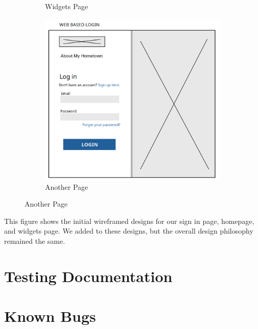 \documentclass[12pt]{article}
\begin{document}
\begin{figure}[htbp]
\begin{subfigure}[b]{0.48\textwidth}
        \caption{Widgets Page}
    \end{subfigure}
    \centering
    \begin{subfigure}[b]{0.48\textwidth}
        \centering
        \includegraphics[width=\textwidth]{images/sign_in_page.png}
        \caption{Another Page}
    \end{subfigure}
\end{figure}

This figure shows the initial wireframed designs for our sign in page, homepage, and widgets page. We added to these designs, but the overall design philosophy remained the same.

\newpage

\section{Testing Documentation}

\newpage

\section{Known Bugs}
\end{document}
